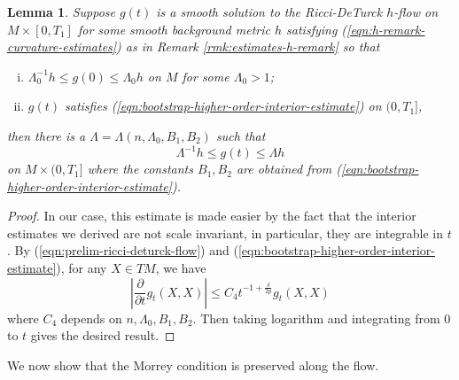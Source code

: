 \documentclass[12pt]{amsart}
\theoremstyle{plain}
\theoremstyle{plain}
\newtheorem{lemma}[subsection]{Lemma}
\theoremstyle{definition}
\theoremstyle{remark}
\numberwithin{equation}{subsection}
\begin{document}
\begin{lemma}\label{lem:Linfty-preservation}
    Suppose $g(t)$ is a smooth solution to the Ricci-DeTurck $h$-flow on $M \times [0,T_1]$ for some smooth background metric $h$ satisfying (\ref{eqn:h-remark-curvature-estimates}) as in Remark \ref{rmk:estimates-h-remark} so that
    \begin{enumerate}[(i)]
        \item $\Lambda_0^{-1}h \leq g(0) \leq \Lambda_0 h$ on $M$ for some $\Lambda_0 > 1$;
        \item $g(t)$ satisfies (\ref{eqn:bootstrap-higher-order-interior-estimate}) on $(0, T_1]$,
    \end{enumerate}
    then there is a $\Lambda = \Lambda(n, \Lambda_0,B_1,B_2)$ such that
    \begin{equation*}
        \Lambda^{-1}h \leq g(t) \leq \Lambda h
    \end{equation*}
    on $M \times (0,T_1]$ where the constants $B_1,B_2$ are obtained from (\ref{eqn:bootstrap-higher-order-interior-estimate}).
\end{lemma}

\begin{proof}
    In our case, this estimate is made easier by the fact that the interior estimates we derived are not scale invariant, in particular, they are integrable in $t$. By (\ref{eqn:prelim-ricci-deturck-flow}) and (\ref{eqn:bootstrap-higher-order-interior-estimate}), for any $X \in TM$, we have
    \begin{equation*}
        \left|\frac{\partial}{\partial t} g_t(X,X)\right| \leq C_4t^{-1+\frac{\delta}{2p}}g_t(X,X)
    \end{equation*}
    where $C_4$ depends on $n, \Lambda_0, B_1, B_2$. Then taking logarithm and integrating from 0 to $t$ gives the desired result.
\end{proof}

We now show that the Morrey condition is preserved along the flow.
\end{document}
